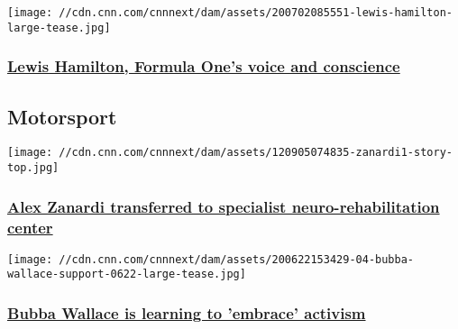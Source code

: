 \href{/2020/07/02/motorsport/lewis-hamilton-formula-one-2020-season-spt-intl/index.html}{}

\texttt{[image: //cdn.cnn.com/cnnnext/dam/assets/200702085551-lewis-hamilton-large-tease.jpg]}

\hypertarget{lewis-hamilton-formula-ones-voice-and-conscience}{%
\subsubsection{\texorpdfstring{\href{/2020/07/02/motorsport/lewis-hamilton-formula-one-2020-season-spt-intl/index.html}{Lewis
Hamilton, Formula One's voice and
conscience}}{Lewis Hamilton, Formula One's voice and conscience}}\label{lewis-hamilton-formula-ones-voice-and-conscience}}

\hypertarget{motorsport-}{%
\subsection{Motorsport~}\label{motorsport-}}

\href{/2020/07/21/sport/alex-zanardi-transfer-hospital-rehabilitation-spt-intl/index.html}{}

\texttt{[image: //cdn.cnn.com/cnnnext/dam/assets/120905074835-zanardi1-story-top.jpg]}

\hypertarget{alex-zanardi-transferred-to-specialist-neuro-rehabilitation-center}{%
\subsubsection{\texorpdfstring{\href{/2020/07/21/sport/alex-zanardi-transfer-hospital-rehabilitation-spt-intl/index.html}{Alex
Zanardi transferred to specialist neuro-rehabilitation
center}}{Alex Zanardi transferred to specialist neuro-rehabilitation center}}\label{alex-zanardi-transferred-to-specialist-neuro-rehabilitation-center}}

\href{/2020/07/17/motorsport/bubba-wallace-nascar-players-tribune-spt-intl/index.html}{}

\texttt{[image: //cdn.cnn.com/cnnnext/dam/assets/200622153429-04-bubba-wallace-support-0622-large-tease.jpg]}

\hypertarget{bubba-wallace-is-learning-to-embrace-activism}{%
\subsubsection{\texorpdfstring{\href{/2020/07/17/motorsport/bubba-wallace-nascar-players-tribune-spt-intl/index.html}{Bubba
Wallace is learning to 'embrace'
activism}}{Bubba Wallace is learning to 'embrace' activism}}\label{bubba-wallace-is-learning-to-embrace-activism}}

